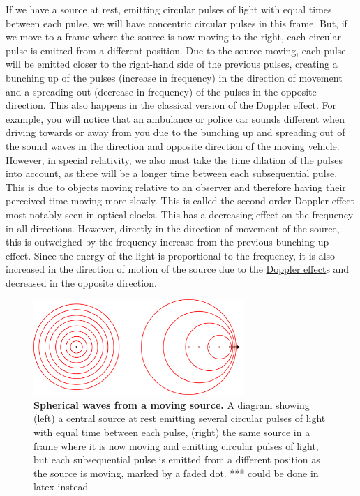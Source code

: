 If we have a source at rest, emitting circular pulses of light with equal times between each pulse, we will have concentric circular pulses in this frame.
But, if we move to a frame where the source is now moving to the right, each circular pulse is emitted from a different position.
Due to the source moving, each pulse will be emitted closer to the right-hand side of the previous pulses, creating a bunching up of the pulses (increase in frequency) in the direction of movement and a spreading out (decrease in frequency) of the pulses in the opposite direction.
This also happens in the classical version of the \hyperlink{def-doppler-effect}{Doppler effect}.
For example, you will notice that an ambulance or police car sounds different when driving towards or away from you due to the bunching up and spreading out of the sound waves in the direction and opposite direction of the moving vehicle.
However, in special relativity, we also must take the \hyperlink{def-time-dilation}{time dilation} of the pulses into account, as there will be a longer time between each subsequential pulse.
This is due to objects moving relative to an observer and therefore having their perceived time moving more slowly.
This is called the second order Doppler effect most notably seen in optical clocks.
This has a decreasing effect on the frequency in all directions.
However, directly in the direction of movement of the source, this is outweighed by the frequency increase from the previous bunching-up effect.
Since the energy of the light is proportional to the frequency, it is also increased in the direction of motion of the source due to the \hyperlink{def-doppler-effect}{Doppler effect}s and decreased in the opposite direction.

\begin{figure}[H]
	\centering
	\includegraphics[width = 8cm]{images/pdf/Doppler.pdf}
	\caption{\textbf{Spherical waves from a moving source.} A diagram showing (left) a central source at rest emitting several circular pulses of light with equal time between each pulse, (right) the same source in a frame where it is now moving and emitting circular pulses of light, but each subsequential pulse is emitted from a different position as the source is moving, marked by a faded dot. *** could be done in latex instead}
	\label{fig: doppler effect intro}
\end{figure}

